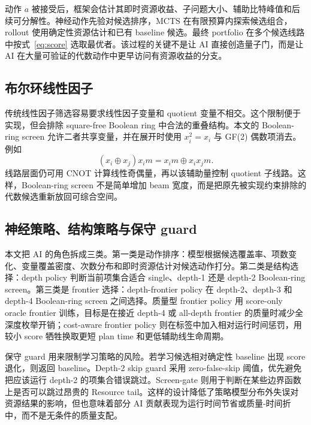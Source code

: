 \documentclass[UTF8,fontset=macnew,11pt]{ctexart}
\newcommand{\screen}{Boolean-ring screen}
\newcommand{\mcts}{\ensuremath{\mathrm{MCTS}}}
\newcommand{\xor}{\ensuremath{\oplus}}
\begin{document}
动作 $a$ 被接受后，框架会估计其即时资源收益、子问题大小、辅助比特峰值和后续可分解性。神经动作先验对候选排序，\mcts{} 在有限预算内探索候选组合，rollout 使用确定性资源估计和已有 baseline 候选。最终 portfolio 在多个候选线路中按式~\eqref{eq:score} 选取最优者。该过程的关键不是让 AI 直接创造量子门，而是让 AI 在大量可验证的代数动作中更早访问有资源收益的分支。

\subsection{布尔环线性因子}

传统线性因子筛选容易要求线性因子变量和 quotient 变量不相交。这个限制便于实现，但会排除 square-free Boolean ring 中合法的重叠结构。本文的 \screen{} 允许二者共享变量，并在展开时使用 $x_i^2=x_i$ 与 GF(2) 偶数项消去。例如
\begin{equation}
  (x_i\xor x_j)x_i m = x_i m \xor x_i x_j m .
  \label{eq:boolean-ring}
\end{equation}
线路层面仍可用 CNOT 计算线性奇偶量，再以该辅助量控制 quotient 子线路。这样，\screen{} 不是简单增加 beam 宽度，而是把原先被实现约束排除的代数候选重新放回可综合空间。

\subsection{神经策略、结构策略与保守 guard}

本文把 AI 的角色拆成三类。第一类是动作排序：模型根据候选覆盖率、项数变化、变量覆盖密度、次数分布和即时资源估计对候选动作打分。第二类是结构选择：depth policy 判断当前项集合适合 single、depth-1 还是 depth-2 \screen{}。第三类是 frontier 选择：depth-frontier policy 在 depth-2、depth-3 和 depth-4 \screen{} 之间选择。质量型 frontier policy 用 score-only oracle frontier 训练，目标是在接近 depth-4 或 all-depth frontier 的质量时减少全深度枚举开销；cost-aware frontier policy 则在标签中加入相对运行时间惩罚，用较小 score 牺牲换取更短 plan time 和更低辅助线生命周期。

保守 guard 用来限制学习策略的风险。若学习候选相对确定性 baseline 出现 score 退化，则返回 baseline。Depth-2 skip guard 采用 zero-false-skip 阈值，优先避免把应该运行 depth-2 的项集合错误跳过。Screen-gate 则用于判断在某些边界函数上是否可以跳过昂贵的 Resource tail。这样的设计降低了策略模型分布外失误对资源结果的影响，但也意味着部分 AI 贡献表现为运行时间节省或质量-时间折中，而不是无条件的质量支配。
\end{document}
